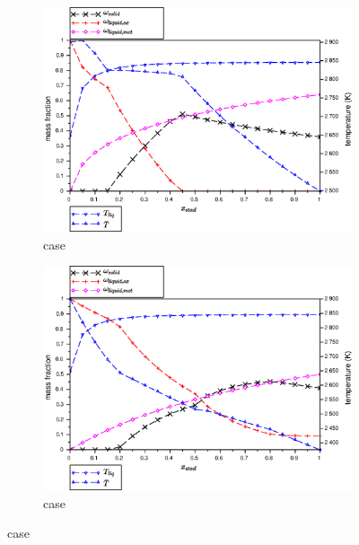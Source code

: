 \begin{figure}[H]
\centering
\begin{subfigure}[t]{0.48\textwidth}
 \centering \includegraphics[width=\textwidth]{figures/CalphadBasedEOSTest/OpenCalphad_NUCLEA9_eq/C32_1850_x-T.eps} 
\caption{ case} \label{fig:x-T_C32_1850_OpenCalphad_NUCLEA9_eq} 
\end{subfigure}
\hspace{0.01\textwidth}%
\begin{subfigure}[t]{0.48\textwidth}
 \centering \includegraphics[width=\textwidth]{figures/CalphadBasedEOSTest/OpenCalphad_NUCLEA9_separatedEqs/C32_1850_x-T.eps} 
\caption{ case} \label{fig:x-T_C32_1850_OpenCalphad_NUCLEA9_separatedEqs} 
\end{subfigure}

\end{figure}
